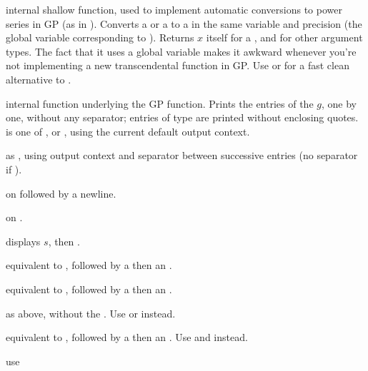 
 internal shallow function, used to implement
automatic conversions to power series in GP (as in ).
Converts a  or a  to a  in the same variable and
precision  (the global variable corresponding to
). Returns $x$ itself for a , and 
for other argument types. The fact that it uses a global variable makes it
awkward whenever you're not implementing a new transcendental function in GP.
Use  or  for a fast clean alternative to
.


 internal function underlying the
 GP function. Prints the entries of the  $g$, one by one,
without any separator; entries of type  are printed without enclosing
quotes. \fl is one of ,  or , using the
current default output context.

 as
, using output context  and separator  between
successive entries (no separator if ).

  on
 followed by a newline.

  on
.

 displays $s$,
then .

 equivalent to , followed
by a  then an .

 equivalent to ,
followed by a  then an .

 as above, without the . Use
 or  instead.

 equivalent to , followed
by a  then an . Use  and
 instead.


 use 

